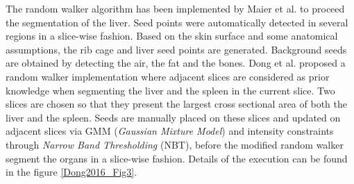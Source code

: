 


The random walker algorithm has been implemented by Maier et al. \cite{Maier2008} to proceed the segmentation of the liver. Seed points were
automatically detected in several regions in a slice-wise fashion. Based
on the skin surface and some anatomical assumptions, the rib cage and
liver seed points are generated. Background seeds are obtained by
detecting the air, the fat and the bones.
Dong et al. \cite{Dong2016} proposed a random walker implementation where adjacent slices are
considered as prior knowledge when segmenting the liver and the spleen in the current slice. Two
slices are chosen so that they present the largest cross sectional area
of both the liver and the spleen. Seeds are manually placed on these
slices and updated on adjacent slices via GMM (\emph{Gaussian Mixture
	Model}) and intensity constraints through \emph{Narrow Band
	Thresholding} (NBT), before the modified random walker segment the organs in a
slice-wise fashion. Details of the execution can be found in the figure
\ref{Dong2016_Fig3}.

